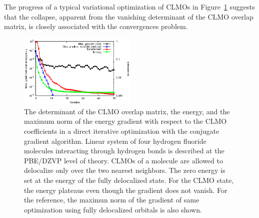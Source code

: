 \documentclass[aps,prl,twocolumn,reprint,amsmath,amssymb]{revtex4-1}
\begin{document}
%
The progress of a typical variational optimization of CLMOs in Figure~\ref{fig:det} suggests that the collapse, apparent from the vanishing determinant of the CLMO overlap matrix, is closely associated with the convergences problem.


\begin{figure}
\includegraphics[width=0.5\textwidth]{det}
\caption{
The determinant of the CLMO overlap matrix, the energy, and the maximum norm of the energy gradient with respect to the CLMO coefficients in a direct iterative optimization with the conjugate gradient algorithm. 
Linear system of four hydrogen fluoride molecules interacting through hydrogen bonds is described at the PBE/DZVP level of theory. 
CLMOs of a molecule are allowed to delocalize only over the two nearest neighbors. 
The zero energy is set at the energy of the fully delocalized state. 
For the CLMO state, the energy plateaus even though the gradient does not vanish. 
For the reference, the maximun norm of the gradient of same optimization using fully delocalized orbitals is also shown. %
}
\label{fig:det}
\end{figure}
\end{document}
